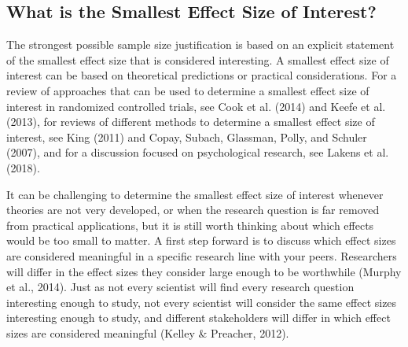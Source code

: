 \documentclass[
  english,
  ,jou, a4paper,floatsintext]{apa6}
\begin{document}
\hypertarget{what-is-the-smallest-effect-size-of-interest}{%
\subsection{What is the Smallest Effect Size of Interest?}\label{what-is-the-smallest-effect-size-of-interest}}

The strongest possible sample size justification is based on an explicit statement of the smallest effect size that is considered interesting. A smallest effect size of interest can be based on theoretical predictions or practical considerations. For a review of approaches that can be used to determine a smallest effect size of interest in randomized controlled trials, see Cook et al. (2014) and Keefe et al. (2013), for reviews of different methods to determine a smallest effect size of interest, see King (2011) and Copay, Subach, Glassman, Polly, and Schuler (2007), and for a discussion focused on psychological research, see Lakens et al. (2018).

It can be challenging to determine the smallest effect size of interest whenever theories are not very developed, or when the research question is far removed from practical applications, but it is still worth thinking about which effects would be too small to matter. A first step forward is to discuss which effect sizes are considered meaningful in a specific research line with your peers. Researchers will differ in the effect sizes they consider large enough to be worthwhile (Murphy et al., 2014). Just as not every scientist will find every research question interesting enough to study, not every scientist will consider the same effect sizes interesting enough to study, and different stakeholders will differ in which effect sizes are considered meaningful (Kelley \& Preacher, 2012).
\end{document}
